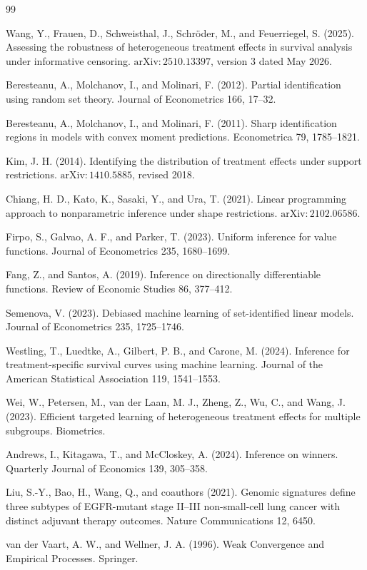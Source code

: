 \documentclass{article}
\begin{document}
\begin{thebibliography}{99}

   Wang, Y., Frauen, D., Schweisthal, J., Schröder, M., and Feuerriegel, S. (2025). Assessing the robustness of heterogeneous treatment effects in survival analysis under informative censoring. \(\mathrm{arXiv}:2510.13397\), version 3 dated May 2026.

   Beresteanu, A., Molchanov, I., and Molinari, F. (2012). Partial identification using random set theory. Journal of Econometrics 166, 17--32.

   Beresteanu, A., Molchanov, I., and Molinari, F. (2011). Sharp identification regions in models with convex moment predictions. Econometrica 79, 1785--1821.

   Kim, J. H. (2014). Identifying the distribution of treatment effects under support restrictions. \(\mathrm{arXiv}:1410.5885\), revised 2018.

   Chiang, H. D., Kato, K., Sasaki, Y., and Ura, T. (2021). Linear programming approach to nonparametric inference under shape restrictions. \(\mathrm{arXiv}:2102.06586\).

   Firpo, S., Galvao, A. F., and Parker, T. (2023). Uniform inference for value functions. Journal of Econometrics 235, 1680--1699.

   Fang, Z., and Santos, A. (2019). Inference on directionally differentiable functions. Review of Economic Studies 86, 377--412.

   Semenova, V. (2023). Debiased machine learning of set-identified linear models. Journal of Econometrics 235, 1725--1746.

   Westling, T., Luedtke, A., Gilbert, P. B., and Carone, M. (2024). Inference for treatment-specific survival curves using machine learning. Journal of the American Statistical Association 119, 1541--1553.

   Wei, W., Petersen, M., van der Laan, M. J., Zheng, Z., Wu, C., and Wang, J. (2023). Efficient targeted learning of heterogeneous treatment effects for multiple subgroups. Biometrics.

   Andrews, I., Kitagawa, T., and McCloskey, A. (2024). Inference on winners. Quarterly Journal of Economics 139, 305--358.

   Liu, S.-Y., Bao, H., Wang, Q., and coauthors (2021). Genomic signatures define three subtypes of EGFR-mutant stage II--III non-small-cell lung cancer with distinct adjuvant therapy outcomes. Nature Communications 12, 6450.

   van der Vaart, A. W., and Wellner, J. A. (1996). Weak Convergence and Empirical Processes. Springer.

\end{thebibliography}
\end{document}
